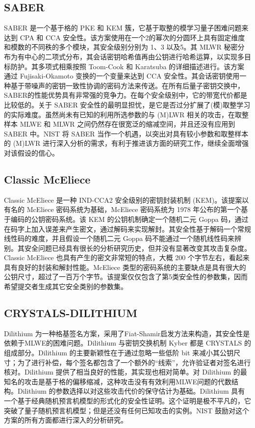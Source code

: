 \subsection{SABER}

SABER 是一个基于格的 PKE 和 KEM 簇，它基于取整的模学习量子困难问题来达到 CPA 和 CCA 安全性。该方案使用在一个2的幂次的分圆环上具有固定维度和模数的不同秩的多个模块，其安全级别分别为 1、3 以及5。其 MLWR 秘密分布为有中心的二项式分布，其会话密钥哈希值再由公钥进行哈希运算，以实现多目标防护。其多项式相乘按照 Toom-Cook 和 Karatsuba 的详细描述进行。该方案通过 Fujisaki-Okamoto 变换的一个变量来达到 CCA 安全性。其会话密钥使用一种基于带噪声的密钥一致性协调的密码方法来传送。在所有后量子密钥交换中，SABER的性能优势具有非常强的竞争力。在每个安全级别中，它的带宽代价都是比较低的。关于 SABER 安全性的最明显担忧，是它是否过分扩展了(模)取整学习的实际难度。虽然尚未有已知的利用所选参数的与 (M)LWR 相关的攻击，在取整样本 MLWE 和 MLWR 之间仍然存在很宽泛的缩减空间，并且还没有应用到 SABER 中。NIST 将 SABER 当作一个机遇，以突出对具有较小参数和取整样本的 (M)LWR 进行深入分析的需求，有利于推进该方面的研究工作，继续全面增强对该假设的信心。

\subsection{Classic McEliece}

Classic McEliece 是一种 IND-CCA2 安全级别的密钥封装机制 (KEM)。该提案以有名的 McEliece 密码系统为基础，McEliece 密码系统为 1978 年公布的第一个基于编码的公钥密码系统。该 KEM 的公钥机制确定一个随机二元 Goppa 码，通过在码字上加入误差来产生密文，通过解码来实现解封。其安全性基于解码一个常规线性码的难度，并且假设一个随机二元 Goppa 码不能通过一个随机线性码来辨别。其安全问题已经具有很长的分析研究历史，但并没有显著改变其攻击复杂度。 Classic McEliece 也具有产生的密文非常短的特点，大概 200 个字节左右，看起来具有良好的封装和解封性能。McEliece 类型的密码系统的主要缺点是具有很大的公钥尺寸，超过了一百万个字节。该提案仅仅包含了第5类安全性的参数集，因而希望提交者生成其它安全类别的参数集。

\subsection{CRYSTALS-DILITHIUM}

Dilithium 为一种格基签名方案，采用了Fiat-Shamir启发方法来构造，其安全性是依赖于MLWE的困难问题。Dilithium 与密钥交换机制 Kyber 都是 CRYSTALS 的组成部分。Dilithium 的主要新颖性在于通过忽略一些低阶 bit 来减小其公钥尺寸；为了进行补偿，每个签名都包含了一个额外的“线索”，允许验证者对签名进行核对。Dilithium 提供了相当良好的性能，其实现也相对简单。对 Dilithium 的最知名的攻击是基于格的偏移缩减，这种攻击没有有效利用MLWE问题的代数结构。Dilithium 的参数选择以对这些攻击代价的保守估计为基础。Dilithium 具有一个基于经典随机预言机模型的形式化的安全性证明。这个证明是极不平凡的，它突破了量子随机预言机模型；但是还没有任何已知攻击的实例。NIST 鼓励对这个方案的所有方面都进行深入的分析研究。

